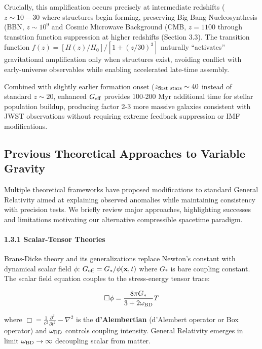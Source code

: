 \documentclass[10pt,a4paper]{article}
\begin{document}
Crucially, this amplification occurs precisely at intermediate redshifts
(\(z \sim 10-30\) where structures begin forming, preserving Big Bang
Nucleosynthesis (BBN, \(z \sim 10^9\) and Cosmic Microwave Background
(CMB, \(z = 1100\) through transition function suppression at higher
redshifts (Section 3.3). The transition function
\(f(z) = [H(z)/H_0]/[1+(z/30)^3]\) naturally ``activates'' gravitational
amplification only when structures exist, avoiding conflict with
early-universe observables while enabling accelerated late-time
assembly.

Combined with slightly earlier formation onset
(\(z_{\rm first~stars} \sim 40\) instead of standard \(z \sim 20\),
enhanced \(G_{\rm eff}\) provides 100-200 Myr additional time for
stellar population buildup, producing factor 2-3 more massive galaxies
consistent with JWST observations \cite{ref30} without requiring extreme feedback
suppression or IMF modifications.

\subsection{Previous Theoretical Approaches to Variable
Gravity}\label{previous-theoretical-approaches-to-variable-gravity}

Multiple theoretical frameworks have proposed modifications to standard
General Relativity aimed at explaining observed anomalies while
maintaining consistency with precision tests. We briefly review major
approaches, highlighting successes and limitations motivating our
alternative compressible spacetime paradigm.

\paragraph{1.3.1 Scalar-Tensor Theories}\label{scalar-tensor-theories}

Brans-Dicke theory \cite{Brans1961} and its generalizations replace Newton's
constant with dynamical scalar field \(\phi\):
\(G_{\rm eff} = G_*/\phi({\bf x},t)\) where \(G_*\) is bare coupling
constant. The scalar field equation couples to the stress-energy tensor
trace:

\[\square\phi = \frac{8\pi G_*}{3 + 2\omega_{\rm BD}} T\]

where \(\Box = \frac{1}{c^2}\frac{\partial^2}{\partial t^2} - \nabla^2\)
is the \textbf{d'Alembertian} (d'Alembert operator or Box operator) and
\(\omega_{\rm BD}\) controls coupling intensity. General Relativity
emerges in limit \(\omega_{\rm BD} \to \infty\) decoupling scalar from
matter.
\end{document}

